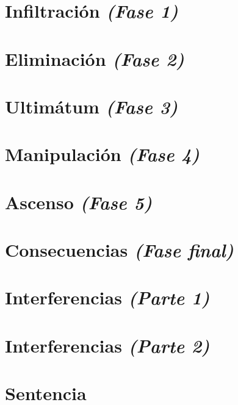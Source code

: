 \documentclass[11pt]{book}
\begin{document}
\chapter{Infiltración \emph{\mdseries(Fase 1)}}


\chapter{Eliminación \emph{\mdseries(Fase 2)}}


\chapter{Ultimátum \emph{\mdseries(Fase 3)}}


\chapter{Manipulación \emph{\mdseries(Fase 4)}}


\chapter{Ascenso \emph{\mdseries(Fase 5)}}


\chapter{Consecuencias \emph{\mdseries(Fase final)}}


\chapter{Interferencias \emph{\mdseries(Parte 1)}}


\chapter{Interferencias \emph{\mdseries(Parte 2)}}


\chapter{Sentencia}

\end{document}
